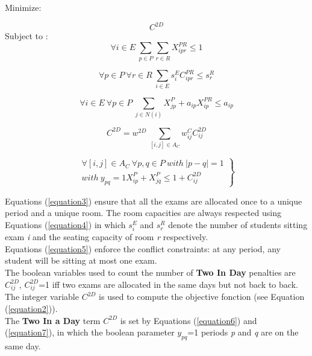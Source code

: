 \documentclass[a4paper, french, 8pt]{report}
\begin{document}
Minimize:

\begin{equation}
	C^{2D}
	\label{equation2}
	\tag{2}
\end{equation}
Subject to :
\begin{equation}
	\forall i \in E ~ \sum_{p \in P} \sum_{r \in R} X_{ipr}^{PR} \le 1
	\label{equation3}
	\tag{3}
\end{equation}

\begin{equation}
	\forall p\in P ~ \forall r \in R ~ \sum_{i \in E} s_{i}^{E} C_{ipr}^{PR} \le s_{r}^{R}
    \label{equation4}
	\tag{4}
\end{equation}

\begin{equation}
	\forall i \in E ~ \forall p \in P ~ \sum_{j \in N (i)} X_{jp}^{P} + a_{ip} X_{ip}^{PR} \le a_{ip}
	\label{equation5}
	\tag{5}
\end{equation}

\begin{equation}
	C^{2D} = w^{2D} ~ \sum_{[i,j] \in A_C} w_{ij}^{C} C_{ij}^{2D}
	\label{equation6}
	\tag{6}
\end{equation}

\begin{equation}
    \left.
    \begin{array}{r}
  
        \forall [i,j] \in A_C ~ \forall p,q \in P ~ with ~ |p-q| = 1 \\
        with ~ y_{pq} = 1 X_{ip}^{P} + X_{jq}^{P} \le 1 + C_{ij}^{2D}
        
    \end{array}
    \right \}
    \label{equation7}
    \tag{7}
\end{equation}

\indent Equations (\ref{equation3})  ensure that all the exams are allocated once to a unique period and a unique
 room. The room capacities are always respected using Equations (\ref{equation4}) in which $s_i^E$ and $s_r^R$
 denote the number of students sitting exam \textit{i} and the seating capacity of room \textit{r} respectively.\\
 \indent Equations (\ref{equation5}) enforce the conflict constraints: at any period, any student will be sitting
 at most one exam.\\
 \indent The boolean variables used to count the number of \textbf{Two In Day} penalties are $C_{ij}^{2D}$, 
 $C_{ij}^{2D}$=1 iff two exams are allocated in the same days but not back to back. The integer
 variable  $C^{2D}$ is used to compute the objective fonction (see Equation (\ref{equation2})). \\
 \indent The \textbf{Two In a Day} term  $C^{2D}$ is set by Equations (\ref{equation6}) and (\ref{equation7}), in which the boolean 
 parameter $y_{pq}$=1 periods \textit{p} and \textit{q} are on the same day.
\end{document}
